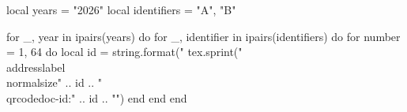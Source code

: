 \documentclass[a4paper,10pt]{article}
\begin{document}
\Large

\begin{luacode*}
  local years = {"2026"}
  local identifiers = {"A", "B"}
  
  for _, year in ipairs(years) do
    for _, identifier in ipairs(identifiers) do
      for number = 1, 64 do
        local id = string.format("%
        tex.sprint("\\addresslabel{\\normalsize{" .. id .. "} \\qrcode{doc-id:" .. id .. "}}")
      end
    end
  end
\end{luacode*}
\end{document}
